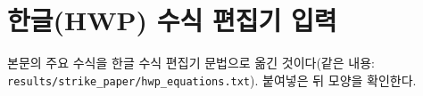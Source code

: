 \documentclass[10pt,a4paper]{article}
\newcommand{\file}[1]{\texttt{\small #1}}
\begin{document}
\section{한글(HWP) 수식 편집기 입력}\label{app:hwp}
본문의 주요 수식을 한글 수식 편집기 문법으로 옮긴 것이다(같은 내용: \file{results/strike\_paper/hwp\_equations.txt}). 붙여넣은 뒤 모양을 확인한다.
\end{document}
